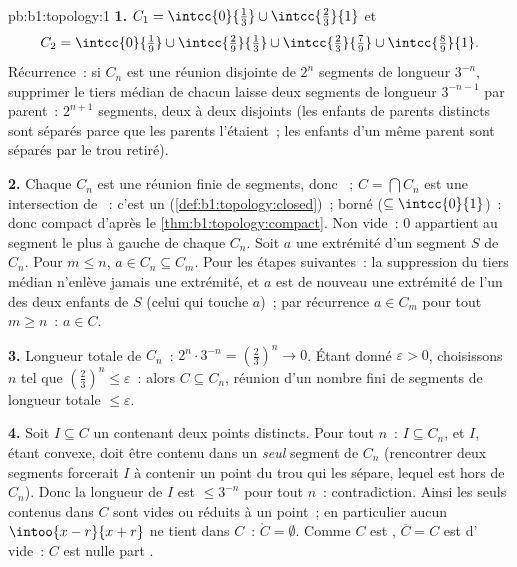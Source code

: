 \begin{solution}{pb:b1:topology:1}
\textbf{1.} $C_1 = \intcc{0}{\frac13} \cup \intcc{\frac23}{1}$
et
\[
C_2 = \intcc{0}{\tfrac19} \cup \intcc{\tfrac29}{\tfrac13}
\cup \intcc{\tfrac23}{\tfrac79} \cup \intcc{\tfrac89}{1} .
\]
Récurrence~: si $C_n$ est une réunion disjointe de $2^n$ segments
 de longueur $3^{-n}$, supprimer le tiers médian  de
chacun laisse deux segments  de longueur $3^{-n-1}$ par
parent~: $2^{n+1}$ segments, deux à deux disjoints (les enfants de
parents distincts sont séparés parce que les parents l'étaient~;
les enfants d'un même parent sont séparés par le trou retiré).

\textbf{2.} Chaque $C_n$ est une réunion finie de segments, donc
~; $C = \bigcap C_n$ est une intersection de ~: c'est un
 (\cref{def:b1:topology:closed})~; borné ($\subseteq
\intcc{0}{1}$)~: donc compact d'après le \cref{thm:b1:topology:compact}.
Non vide~: $0$ appartient au segment le plus à gauche de chaque
$C_n$. Soit $a$ une extrémité d'un segment $S$ de $C_n$. Pour
$m \leq n$, $a \in C_n \subseteq C_m$. Pour les étapes suivantes~: la
suppression du tiers médian n'enlève jamais une extrémité, et $a$
est de nouveau une extrémité de l'un des deux enfants de $S$ (celui
qui touche $a$)~; par récurrence $a \in C_m$ pour tout $m \geq n$~:
$a \in C$.

\textbf{3.} Longueur totale de $C_n$~: $2^n \cdot 3^{-n} =
(\frac23)^n \to 0$. Étant donné $\varepsilon > 0$, choisissons $n$
tel que $(\frac23)^n \leq \varepsilon$~: alors $C \subseteq C_n$,
réunion d'un nombre fini de segments de longueur totale $\leq
\varepsilon$.

\textbf{4.} Soit $I \subseteq C$ un  contenant deux points
distincts. Pour tout $n$~: $I \subseteq C_n$, et $I$, étant convexe,
doit être contenu dans un \emph{seul} segment de $C_n$ (rencontrer
deux segments forcerait $I$ à contenir un point du trou qui les
sépare, lequel est hors de $C_n$). Donc la longueur de $I$ est $\leq
3^{-n}$ pour tout $n$~: contradiction. Ainsi les seuls 
contenus dans $C$ sont vides ou réduits à un point~; en particulier
aucun $\intoo{x-r}{x+r}$ ne tient dans $C$~: $\mathring C =
\emptyset$. Comme $C$ est , $\overline C = C$ est d'
vide~: $C$ est nulle part .


\end{solution}
